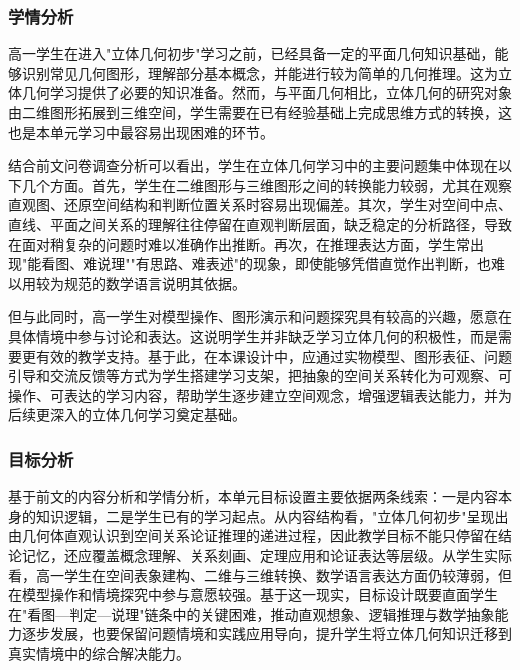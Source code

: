 \documentclass[UTF8,a4paper,12pt,twoside]{ctexart}
\begin{document}
\subsubsection{学情分析}

高一学生在进入"立体几何初步"学习之前，已经具备一定的平面几何知识基础，能够识别常见几何图形，理解部分基本概念，并能进行较为简单的几何推理。这为立体几何学习提供了必要的知识准备。然而，与平面几何相比，立体几何的研究对象由二维图形拓展到三维空间，学生需要在已有经验基础上完成思维方式的转换，这也是本单元学习中最容易出现困难的环节。

结合前文问卷调查分析可以看出，学生在立体几何学习中的主要问题集中体现在以下几个方面。首先，学生在二维图形与三维图形之间的转换能力较弱，尤其在观察直观图、还原空间结构和判断位置关系时容易出现偏差。其次，学生对空间中点、直线、平面之间关系的理解往往停留在直观判断层面，缺乏稳定的分析路径，导致在面对稍复杂的问题时难以准确作出推断。再次，在推理表达方面，学生常出现"能看图、难说理""有思路、难表述"的现象，即使能够凭借直觉作出判断，也难以用较为规范的数学语言说明其依据。

但与此同时，高一学生对模型操作、图形演示和问题探究具有较高的兴趣，愿意在具体情境中参与讨论和表达。这说明学生并非缺乏学习立体几何的积极性，而是需要更有效的教学支持。基于此，在本课设计中，应通过实物模型、图形表征、问题引导和交流反馈等方式为学生搭建学习支架，把抽象的空间关系转化为可观察、可操作、可表达的学习内容，帮助学生逐步建立空间观念，增强逻辑表达能力，并为后续更深入的立体几何学习奠定基础。

\subsubsection{目标分析}

基于前文的内容分析和学情分析，本单元目标设置主要依据两条线索：一是内容本身的知识逻辑，二是学生已有的学习起点。从内容结构看，"立体几何初步"呈现出由几何体直观认识到空间关系论证推理的递进过程，因此教学目标不能只停留在结论记忆，还应覆盖概念理解、关系刻画、定理应用和论证表达等层级。从学生实际看，高一学生在空间表象建构、二维与三维转换、数学语言表达方面仍较薄弱，但在模型操作和情境探究中参与意愿较强。基于这一现实，目标设计既要直面学生在"看图—判定—说理"链条中的关键困难，推动直观想象、逻辑推理与数学抽象能力逐步发展，也要保留问题情境和实践应用导向，提升学生将立体几何知识迁移到真实情境中的综合解决能力。
\end{document}
